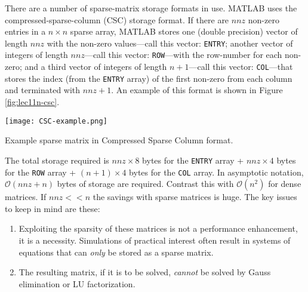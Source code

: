 There are a number of sparse-matrix storage formats in use.  MATLAB uses the compressed-sparse-column (CSC) storage format.\cite{gilbert1992sparse}  If there are $nnz$ non-zero entries in a $n \times n$ sparse array, MATLAB stores one (double precision) vector of length $nnz$ with the non-zero values---call this vector: \lstinline[style=myMatlab]{ENTRY}; another vector of integers of length $nnz$---call this vector: \lstinline[style=myMatlab]{ROW}---with the row-number for each non-zero; and a third vector of integers of length $n+1$---call this vector: \lstinline[style=myMatlab]{COL}---that stores the index (from the \lstinline[style=myMatlab]{ENTRY} array) of the first non-zero from each column and terminated with $nnz+1$.  An example of this format is shown in Figure \ref{fig:lec11n-csc}. \begin{marginfigure}
\texttt{[image: CSC-example.png]}
\caption{Example sparse matrix in Compressed Sparse Column format.}
\label{fig:lec11n-csc}
\end{marginfigure} The total storage required is $nnz \times 8$ bytes for the \lstinline[style=myMatlab]{ENTRY} array + $nnz \times 4$ bytes for the \lstinline[style=myMatlab]{ROW} array + $(n+1) \times 4$ bytes for the \lstinline[style=myMatlab]{COL} array.  In asymptotic notation, $\mathcal{O}(nnz+n)$ bytes of storage are required.  Contrast this with $\mathcal{O}(n^2)$ for dense matrices.  If $nnz << n$ the savings with sparse matrices is huge.  The key issues to keep in mind are these:
\begin{enumerate}
\item Exploiting the sparsity of these matrices is not a performance enhancement, it is a necessity.  Simulations of practical interest often result in systems of equations that can \emph{only} be stored as a sparse matrix.
\item The resulting matrix, if it is to be solved, \emph{cannot} be solved by Gauss elimination or LU factorization.
\end{enumerate}

